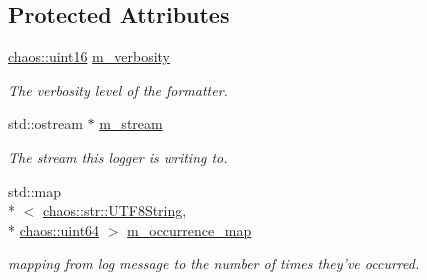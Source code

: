 \subsection*{Protected Attributes}
\begin{DoxyCompactItemize}
\item 
\hypertarget{classchaos_1_1test_1_1log__formatter_1_1_abstract_test_log_formatter_a75e69ea1b26afaceb31c579fb2fcc2f4}{\hyperlink{namespacechaos_ac3888b1c9e56da7fbbdb3ab8425b4068}{chaos\-::uint16} \hyperlink{classchaos_1_1test_1_1log__formatter_1_1_abstract_test_log_formatter_a75e69ea1b26afaceb31c579fb2fcc2f4}{m\-\_\-verbosity}}\label{classchaos_1_1test_1_1log__formatter_1_1_abstract_test_log_formatter_a75e69ea1b26afaceb31c579fb2fcc2f4}

\begin{DoxyCompactList}\small\item\em The verbosity level of the formatter. \end{DoxyCompactList}\item 
\hypertarget{classchaos_1_1test_1_1log__formatter_1_1_abstract_test_log_formatter_a39664df72c625247706e85fe7a7d3272}{std\-::ostream $\ast$ \hyperlink{classchaos_1_1test_1_1log__formatter_1_1_abstract_test_log_formatter_a39664df72c625247706e85fe7a7d3272}{m\-\_\-stream}}\label{classchaos_1_1test_1_1log__formatter_1_1_abstract_test_log_formatter_a39664df72c625247706e85fe7a7d3272}

\begin{DoxyCompactList}\small\item\em The stream this logger is writing to. \end{DoxyCompactList}\item 
\hypertarget{classchaos_1_1test_1_1log__formatter_1_1_abstract_test_log_formatter_aa78456083c88a8573e253611e9b42c37}{std\-::map\\*
$<$ \hyperlink{classchaos_1_1str_1_1_u_t_f8_string}{chaos\-::str\-::\-U\-T\-F8\-String}, \\*
\hyperlink{namespacechaos_a34fe5f5bfc3ef6d80b5d094ed91b4d6e}{chaos\-::uint64} $>$ \hyperlink{classchaos_1_1test_1_1log__formatter_1_1_abstract_test_log_formatter_aa78456083c88a8573e253611e9b42c37}{m\-\_\-occurrence\-\_\-map}}\label{classchaos_1_1test_1_1log__formatter_1_1_abstract_test_log_formatter_aa78456083c88a8573e253611e9b42c37}

\begin{DoxyCompactList}\small\item\em mapping from log message to the number of times they've occurred. \end{DoxyCompactList}\end{DoxyCompactItemize}


